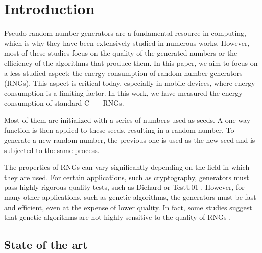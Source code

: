 \documentclass[dvipsnames,format=sigconf,anonymous=true,review=true]{acmart}
\begin{document}


\maketitle

\section{Introduction}
\label{sec:introduction}

Pseudo-random number generators \cite{marsaglia2003random} are a fundamental resource in computing, which is why they have been extensively studied in numerous works. However, most of these studies focus on the quality of the generated numbers or the efficiency of the algorithms that produce them. In this paper, we aim to focus on a less-studied aspect: the energy consumption of random number generators (RNGs). This aspect is critical today, especially in mobile devices, where energy consumption is a limiting factor. In this work, we have measured the energy consumption of standard C++ RNGs.

Most of them are initialized with a series of numbers used as seeds. A one-way function is then applied to these seeds, resulting in a random number. To generate a new random number, the previous one is used as the new seed and is subjected to the same process.

The properties of RNGs can vary significantly depending on the field in which they are used. For certain applications, such as cryptography, generators must pass highly rigorous quality tests, such as Diehard \cite{marsaglia1997diehard} or TestU01 \cite{testu01}. However, for many other applications, such as genetic algorithms, the generators must be fast and efficient, even at the expense of lower quality. In fact, some studies suggest that genetic algorithms are not highly sensitive to the quality of RNGs \cite{cardenas2011sensitiveness}.

\subsection{State of the art}
\label{sec:state-of-the-art}
\end{document}
